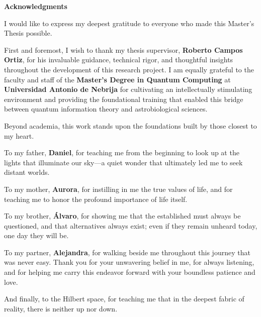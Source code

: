 \cleardoublepage
{\LARGE\bfseries\color{nebrijared}Acknowledgments\par}
\fontsize{11}{13}\selectfont

\begin{itshape}
I would like to express my deepest gratitude to everyone who made this Master's Thesis possible.

First and foremost, I wish to thank my thesis supervisor, \textbf{Roberto Campos Ortiz}, for his invaluable guidance, technical rigor, and thoughtful insights throughout the development of this research project. I am equally grateful to the faculty and staff of the \textbf{Master's Degree in Quantum Computing} at \textbf{Universidad Antonio de Nebrija} for cultivating an intellectually stimulating environment and providing the foundational training that enabled this bridge between quantum information theory and astrobiological sciences.

Beyond academia, this work stands upon the foundations built by those closest to my heart. 

To my father, \textbf{Daniel}, for teaching me from the beginning to look up at the lights that illuminate our sky---a quiet wonder that ultimately led me to seek distant worlds.

To my mother, \textbf{Aurora}, for instilling in me the true values of life, and for teaching me to honor the profound importance of life itself.

To my brother, \textbf{Álvaro}, for showing me that the established must always be questioned, and that alternatives always exist; even if they remain unheard today, one day they will be.

To my partner, \textbf{Alejandra}, for walking beside me throughout this journey that was never easy. Thank you for your unwavering belief in me, for always listening, and for helping me carry this endeavor forward with your boundless patience and love.

And finally, to the Hilbert space, for teaching me that in the deepest fabric of reality, there is neither up nor down.
\end{itshape}
